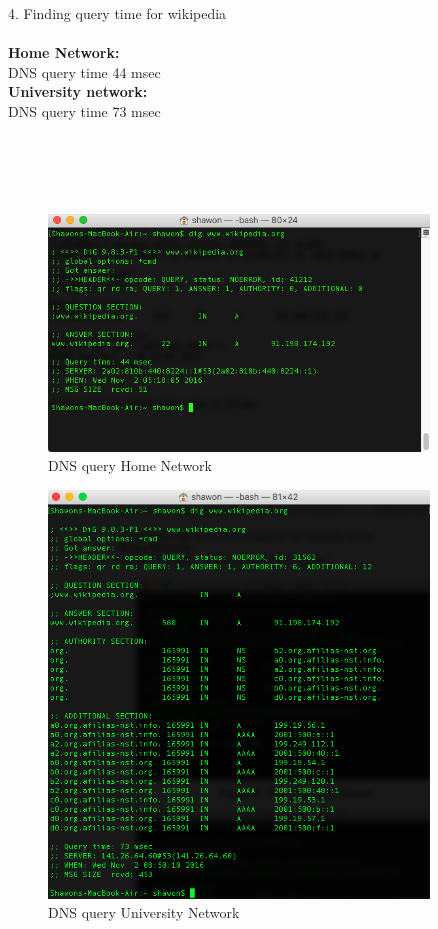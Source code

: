 \documentclass{WeSTassignment}
\begin{document}
\textrm{4. Finding query time for wikipedia}\\ \\
\textbf{Home Network:\\}
DNS query time 44 msec\\
\textbf{University network:\\}
DNS query time 73 msec\\ \\ \\ \\ \\
\begin{figure}[bp!]
  \centering
  \includegraphics[width=0.9\textwidth]{home_query.png}
   \caption{DNS query Home Network}
     \label{fig:dnsquery}
\end{figure}
\begin{figure}[bp!]
  \centering
  \includegraphics[width=0.9\textwidth]{uni_query.png}
   \caption{DNS query University Network}
     \label{fig:dnsquery}
\end{figure}
\end{document}
